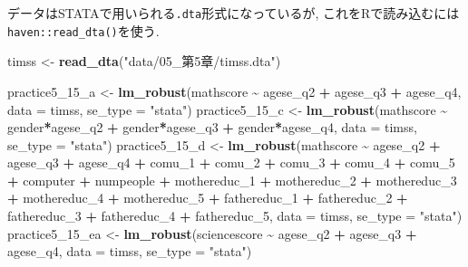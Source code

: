 \documentclass[
]{book}
\newenvironment{Shaded}{\begin{snugshade}}{\end{snugshade}}
\newcommand{\AttributeTok}[1]{\textcolor[rgb]{0.13,0.29,0.53}{#1}}
\newcommand{\FunctionTok}[1]{\textcolor[rgb]{0.13,0.29,0.53}{\textbf{#1}}}
\newcommand{\NormalTok}[1]{#1}
\newcommand{\OtherTok}[1]{\textcolor[rgb]{0.56,0.35,0.01}{#1}}
\newcommand{\SpecialCharTok}[1]{\textcolor[rgb]{0.81,0.36,0.00}{\textbf{#1}}}
\newcommand{\StringTok}[1]{\textcolor[rgb]{0.31,0.60,0.02}{#1}}
\begin{document}
データはSTATAで用いられる\texttt{.dta}形式になっているが, これをRで読み込むには\texttt{haven::read\_dta()}を使う.

\begin{Shaded}
\begin{Highlighting}[]
\NormalTok{timss }\OtherTok{\textless{}{-}} \FunctionTok{read\_dta}\NormalTok{(}\StringTok{"data/05\_第5章/timss.dta"}\NormalTok{)}

\NormalTok{practice5\_15\_a }\OtherTok{\textless{}{-}} \FunctionTok{lm\_robust}\NormalTok{(mathscore }\SpecialCharTok{\textasciitilde{}}\NormalTok{ agese\_q2 }\SpecialCharTok{+}\NormalTok{ agese\_q3 }\SpecialCharTok{+}\NormalTok{ agese\_q4, }\AttributeTok{data =}\NormalTok{ timss, }\AttributeTok{se\_type =} \StringTok{"stata"}\NormalTok{)}
\NormalTok{practice5\_15\_c }\OtherTok{\textless{}{-}} \FunctionTok{lm\_robust}\NormalTok{(mathscore }\SpecialCharTok{\textasciitilde{}}\NormalTok{ gender}\SpecialCharTok{*}\NormalTok{agese\_q2 }\SpecialCharTok{+}\NormalTok{ gender}\SpecialCharTok{*}\NormalTok{agese\_q3 }\SpecialCharTok{+}\NormalTok{ gender}\SpecialCharTok{*}\NormalTok{agese\_q4, }\AttributeTok{data =}\NormalTok{ timss, }\AttributeTok{se\_type =} \StringTok{"stata"}\NormalTok{)}
\NormalTok{practice5\_15\_d }\OtherTok{\textless{}{-}} \FunctionTok{lm\_robust}\NormalTok{(mathscore }\SpecialCharTok{\textasciitilde{}}\NormalTok{ agese\_q2 }\SpecialCharTok{+}\NormalTok{ agese\_q3 }\SpecialCharTok{+}\NormalTok{ agese\_q4 }\SpecialCharTok{+}\NormalTok{ comu\_1 }\SpecialCharTok{+}\NormalTok{ comu\_2 }\SpecialCharTok{+}\NormalTok{ comu\_3 }\SpecialCharTok{+}\NormalTok{ comu\_4 }\SpecialCharTok{+}\NormalTok{ comu\_5 }\SpecialCharTok{+}\NormalTok{ computer }\SpecialCharTok{+}\NormalTok{ numpeople }\SpecialCharTok{+}\NormalTok{ mothereduc\_1 }\SpecialCharTok{+}\NormalTok{ mothereduc\_2 }\SpecialCharTok{+}\NormalTok{ mothereduc\_3 }\SpecialCharTok{+}\NormalTok{ mothereduc\_4 }\SpecialCharTok{+}\NormalTok{ mothereduc\_5 }\SpecialCharTok{+}\NormalTok{ fathereduc\_1 }\SpecialCharTok{+}\NormalTok{ fathereduc\_2 }\SpecialCharTok{+}\NormalTok{ fathereduc\_3 }\SpecialCharTok{+}\NormalTok{ fathereduc\_4 }\SpecialCharTok{+}\NormalTok{ fathereduc\_5, }\AttributeTok{data =}\NormalTok{ timss, }\AttributeTok{se\_type =} \StringTok{"stata"}\NormalTok{)}
\NormalTok{practice5\_15\_ea }\OtherTok{\textless{}{-}} \FunctionTok{lm\_robust}\NormalTok{(sciencescore }\SpecialCharTok{\textasciitilde{}}\NormalTok{ agese\_q2 }\SpecialCharTok{+}\NormalTok{ agese\_q3 }\SpecialCharTok{+}\NormalTok{ agese\_q4, }\AttributeTok{data =}\NormalTok{ timss, }\AttributeTok{se\_type =} \StringTok{"stata"}\NormalTok{)}

\end{Highlighting}
\end{Shaded}
\end{document}
